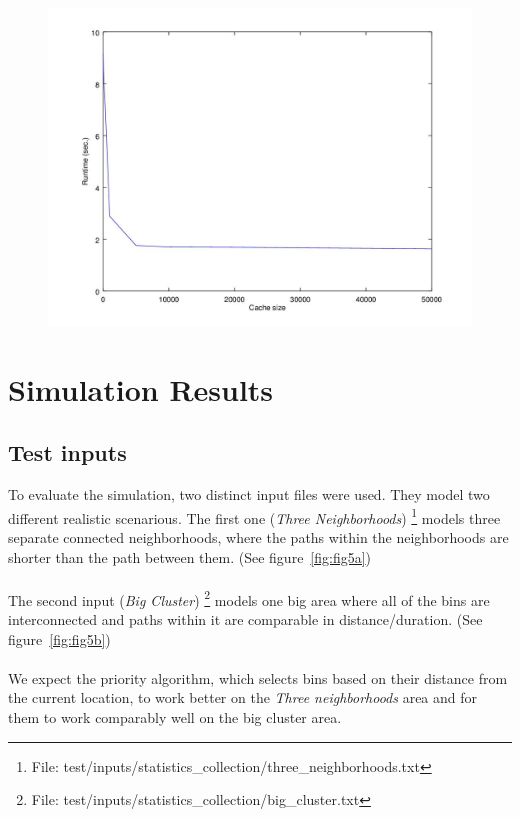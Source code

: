 \documentclass{article}
\begin{document}
			\begin{figure}[H]
			\centering
				\includegraphics[width=.55\columnwidth]{resources/cache_size.jpg}
				\label{fig:fig4}
			\end{figure}
			

	\section{Simulation Results} \label{stats}

		\subsection{Test inputs}
			To evaluate the simulation, two distinct input files were used. They model two different realistic scenarious.
			The first one (\textit{Three Neighborhoods}) \footnote{File: test/inputs/statistics\_collection/three\_neighborhoods.txt} models three separate connected neighborhoods, where the paths
			within the neighborhoods are shorter than the path between them. (See figure~\ref{fig:fig5a}) 
			\\
			\\
			The second input (\textit{Big Cluster}) \footnote{File: test/inputs/statistics\_collection/big\_cluster.txt} models one big area where all of the bins are interconnected and paths
			within it are comparable in distance/duration. (See figure~\ref{fig:fig5b})
			\\
			\\
			We expect the priority algorithm, which selects bins based on their distance from the current location, to work
			better on the \textit{Three neighborhoods} area and for them to work comparably well on the big cluster area.
\end{document}
